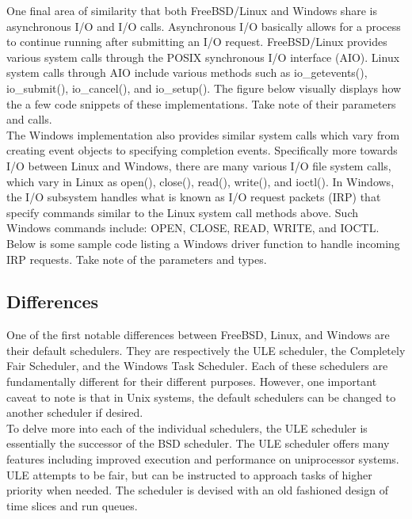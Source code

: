 \documentclass[letterpaper,10pt,titlepage]{article}
\begin{document}
One final area of similarity that both FreeBSD/Linux and Windows share is asynchronous I/O and I/O calls.  Asynchronous I/O basically allows for a process to continue running after submitting an I/O request.  FreeBSD/Linux provides various system calls through the POSIX synchronous I/O interface (AIO).  Linux system calls through AIO include various methods such as io\_getevents(),  io\_submit(), io\_cancel(), and io\_setup().  The figure below visually displays how the a few code snippets of these implementations. \cite{linuxAIO}  Take note of their parameters and calls.\\



The Windows implementation also provides similar system calls which vary from creating event objects to specifying completion events.  Specifically more towards I/O between Linux and Windows, there are many various I/O file system calls, which vary in Linux as open(), close(), read(), write(), and ioctl().\cite{lkd14}  In Windows, the I/O subsystem handles what is known as I/O request packets (IRP) that specify commands similar to the Linux system call methods above.  Such Windows commands include: OPEN, CLOSE, READ, WRITE, and IOCTL.\cite{mwi8}  Below is some sample code listing a Windows driver function to handle incoming IRP requests. \cite{windowsIRP} Take note of the parameters and types.\\

\newpage



\subsection{Differences}

One of the first notable differences between FreeBSD, Linux, and Windows are their default schedulers.  They are respectively the ULE scheduler, the Completely Fair Scheduler, and the Windows Task Scheduler.  Each of these schedulers are fundamentally different for their different purposes.  However, one important caveat to note is that in Unix systems, the default schedulers can be changed to another scheduler if desired.\\

To delve more into each of the individual schedulers, the ULE scheduler is essentially the successor of the BSD scheduler.  The ULE scheduler offers many features including improved execution and performance on uniprocessor systems.\cite{lkd14}  ULE attempts to be fair, but can be instructed to approach tasks of higher priority when needed.  The scheduler is devised with an old fashioned design of time slices and run queues.\\
\end{document}
